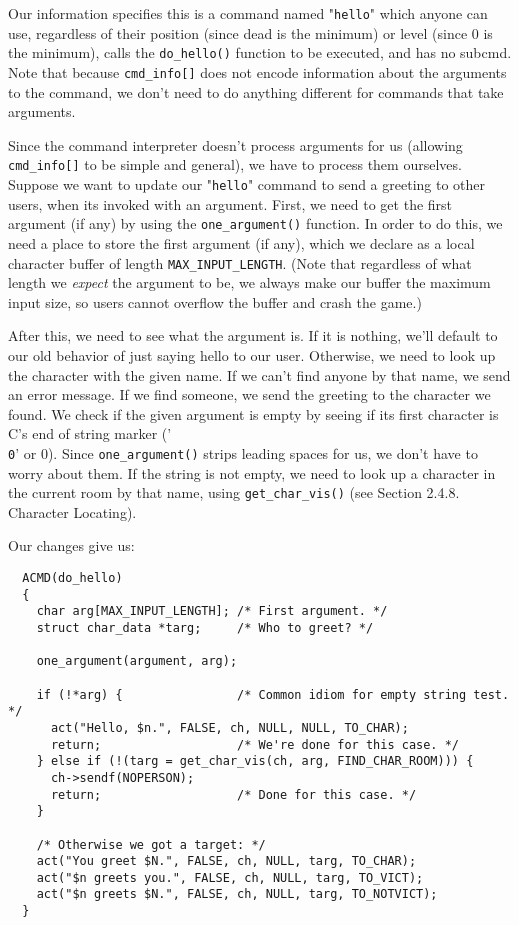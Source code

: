 \documentclass[11pt]{article}
\begin{document}
Our information specifies this is a command named "\texttt{hello}" which anyone can use, regardless of their position (since dead is the minimum) or level (since 0 is the minimum), calls the \texttt{do\_hello()} function to be executed, and has no subcmd.  Note that because \texttt{cmd\_info[]} does not encode information about the arguments to the command, we don't need to do anything different for commands that take arguments.
\par
Since the command interpreter doesn't process arguments for us (allowing \texttt{cmd\_info[]} to be simple and general), we have to process them ourselves.  Suppose we want to update our "\texttt{hello}" command to send a greeting to other users, when its invoked with an argument.  First, we need to get the first argument (if any) by using the \texttt{one\_argument()} function.  In order to do this, we need a place to store the first argument (if any), which we declare as a local character buffer of length \texttt{MAX\_INPUT\_LENGTH}.  (Note that regardless of what length we {\em expect} the argument to be, we always make our buffer the maximum input size, so users cannot overflow the buffer and crash the game.)
\par
After this, we need to see what the argument is.  If it is nothing, we'll default to our old behavior of just saying hello to our user.  Otherwise, we need to look up the character with the given name.  If we can't find anyone by that name, we send an error message.  If we find someone, we send the greeting to the character we found.  We check if the given argument is empty by seeing if its first character is C's end of string marker ('\texttt{\\0}' or 0).  Since \texttt{one\_argument()} strips leading spaces for us, we don't have to worry about them.  If the string is not empty, we need to look up a character in the current room by that name, using \texttt{get\_char\_vis()} (see Section 2.4.8. Character Locating).
\par
Our changes give us:
\begin{verbatim}
  ACMD(do_hello)
  {
    char arg[MAX_INPUT_LENGTH]; /* First argument. */
    struct char_data *targ;     /* Who to greet? */

    one_argument(argument, arg);

    if (!*arg) {                /* Common idiom for empty string test. */
      act("Hello, $n.", FALSE, ch, NULL, NULL, TO_CHAR);
      return;                   /* We're done for this case. */
    } else if (!(targ = get_char_vis(ch, arg, FIND_CHAR_ROOM))) {
      ch->sendf(NOPERSON);
      return;                   /* Done for this case. */
    }

    /* Otherwise we got a target: */
    act("You greet $N.", FALSE, ch, NULL, targ, TO_CHAR);
    act("$n greets you.", FALSE, ch, NULL, targ, TO_VICT);
    act("$n greets $N.", FALSE, ch, NULL, targ, TO_NOTVICT);
  }
\end{verbatim}
\end{document}
